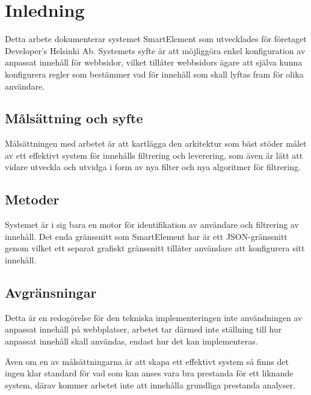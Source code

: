 \section{Inledning}

Detta arbete dokumenterar systemet SmartElement som utvecklades för företaget Developer’s Helsinki Ab. Systemets syfte är att möjliggöra enkel konfiguration av anpassat innehåll för webbsidor, vilket tillåter webbsidors ägare att själva kunna konfigurera regler som bestämmer vad för innehåll som skall lyftas fram för olika användare.

\subsection{Målsättning och syfte}

Målsättningen med arbetet är att kartlägga den arkitektur som bäst stöder målet av ett effektivt system för innehålls filtrering och leverering, som även är lätt att vidare utveckla och utvidga i form av nya filter och nya algoritmer för filtrering.



\subsection{Metoder}

Systemet är i sig bara en motor för identifikation av användare och filtrering av innehåll. Det enda gränssnitt som SmartElement har är ett JSON-gränssnitt genom vilket ett separat grafiskt gränssnitt tillåter användare att konfigurera sitt innehåll.

\subsection{Avgränsningar}

Detta är en redogörelse för den tekniska implementeringen inte användningen av anpassat innehåll på webbplatser, arbetet tar därmed inte ställning till hur anpassat innehåll skall användas, endast hur det kan implementeras.

Även om en av målsättningarna är att skapa ett effektivt system så finns det ingen klar standard för vad som kan anses vara bra prestanda för ett liknande system, därav kommer arbetet inte att innehålla grundliga prestanda analyser.

